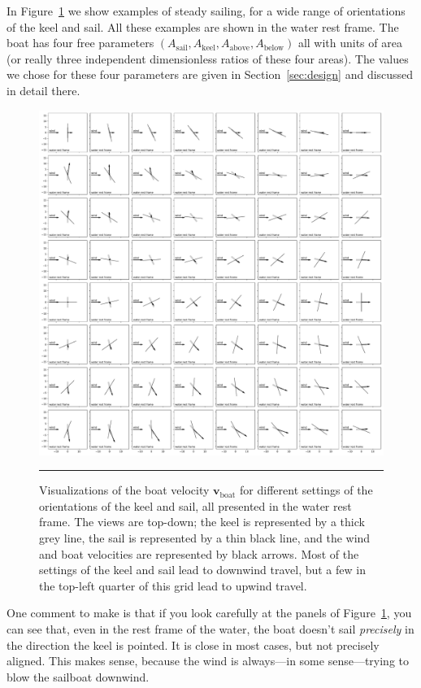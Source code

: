 \documentclass[letterpaper]{article}
\renewcommand{\vec}[1]{\boldsymbol{#1}}
\newcommand{\boat}{\text{boat}}
\newcommand{\sail}{\text{sail}}
\newcommand{\keel}{\text{keel}}
\renewcommand{\above}{\text{above}}
\newcommand{\below}{\text{below}}
\newcommand{\vboat}{\vec{v}_\boat}
\newcommand{\secref}[1]{Section~\ref{#1}}
\newcommand{\figref}[1]{Figure~\ref{#1}}
\newcommand{\figurerule}{\rule[1ex]{\textwidth}{0.2pt}}
\begin{document}
In \figref{fig:steady} we show examples of steady sailing, for a wide range of orientations of the keel and sail.
All these examples are shown in the water rest frame.
The boat has four free parameters $(A_\sail,A_\keel,A_{\above},A_{\below})$ all with units of area (or really three independent dimensionless ratios of these four areas).
The values we chose for these four parameters are given in \secref{sec:design} and discussed in detail there.
\begin{figure}[t!]
  \includegraphics[width=\textwidth]{steady.pdf}
  \caption{Visualizations of the boat velocity $\vboat$ for different settings of the orientations of the keel and sail, all presented in the water rest frame.
  The views are top-down; the keel is represented by a thick grey line, the sail is represented by a thin black line, and the wind and boat velocities are represented by black arrows.
  Most of the settings of the keel and sail lead to downwind travel, but a few in the top-left quarter of this grid lead to upwind travel.\label{fig:steady}}
  \figurerule
\end{figure}

One comment to make is that if you look carefully at the panels of \figref{fig:steady}, you can see that, even in the rest frame of the water, the boat doesn't sail \emph{precisely} in the direction the keel is pointed.
It is close in most cases, but not precisely aligned.
This makes sense, because the wind is always---in some sense---trying to blow the sailboat downwind.
\end{document}
